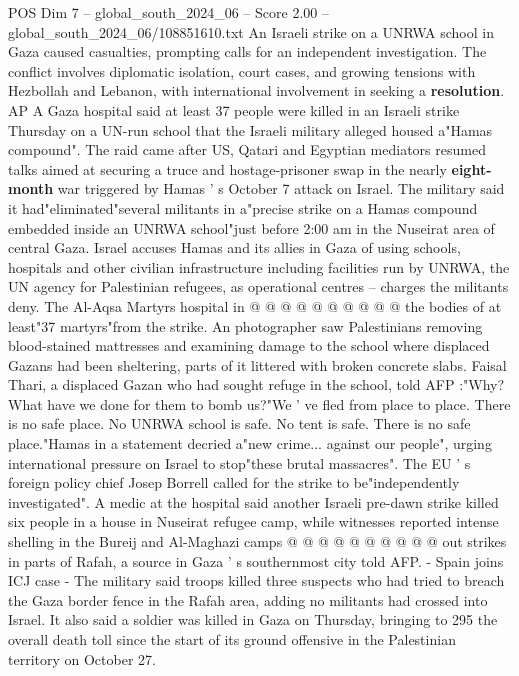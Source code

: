 \begin{textsample}{POS Dim 7 – global\_south\_2024\_06 – Score 2.00 – global\_south\_2024\_06/108851610.txt}  \label{ex:f7_pos_089}
An Israeli strike on a UNRWA school in Gaza caused casualties, prompting calls for an independent investigation.
The conflict involves diplomatic isolation, court cases, and growing tensions with Hezbollah and Lebanon, with international involvement in seeking a \textbf{resolution}.
AP A Gaza hospital said at least 37 people were killed in an Israeli strike Thursday on a UN-run school that the Israeli military alleged housed a"Hamas compound".
The raid came after US, Qatari and Egyptian mediators resumed talks aimed at securing a truce and hostage-prisoner swap in the nearly \textbf{eight-month} war triggered by Hamas ' s October 7 attack on Israel.
The military said it had"eliminated"several militants in a"precise strike on a Hamas compound embedded inside an UNRWA school"just before 2:00 am in the Nuseirat area of central Gaza.
Israel accuses Hamas and its allies in Gaza of using schools, hospitals and other civilian infrastructure including facilities run by UNRWA, the UN agency for Palestinian refugees, as operational centres -- charges the militants deny.
The Al-Aqsa Martyrs hospital in @ @ @ @ @ @ @ @ @ @ the bodies of at least"37 martyrs"from the strike.
An photographer saw Palestinians removing blood-stained mattresses and examining damage to the school where displaced Gazans had been sheltering, parts of it littered with broken concrete slabs.
Faisal Thari, a displaced Gazan who had sought refuge in the school, told AFP :"Why?
What have we done for them to bomb us?"We ' ve fled from place to place.
There is no safe place.
No UNRWA school is safe.
No tent is safe.
There is no safe place."Hamas in a statement decried a"new crime... against our people", urging international pressure on Israel to stop"these brutal massacres".
The EU ' s foreign policy chief Josep Borrell called for the strike to be"independently investigated".
A medic at the hospital said another Israeli pre-dawn strike killed six people in a house in Nuseirat refugee camp, while witnesses reported intense shelling in the Bureij and Al-Maghazi camps @ @ @ @ @ @ @ @ @ @ out strikes in parts of Rafah, a source in Gaza ' s southernmost city told AFP. - Spain joins ICJ case - The military said troops killed three suspects who had tried to breach the Gaza border fence in the Rafah area, adding no militants had crossed into Israel.
It also said a soldier was killed in Gaza on Thursday, bringing to 295 the overall death toll since the start of its ground offensive in the Palestinian territory on October 27.

\end{textsample}
